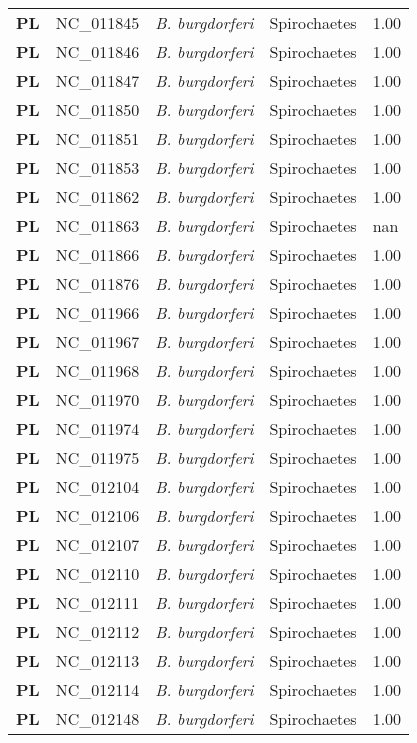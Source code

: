 \begin{adjustwidth}{-3cm}{2cm}
{\begin{supertabular}{>{\bfseries}l|p{0.1\textwidth}p{0.14\textwidth}l|l}
PL & NC\_011845 & \textit{B. burgdorferi} & Spirochaetes & 1.00\\
PL & NC\_011846 & \textit{B. burgdorferi} & Spirochaetes & 1.00\\
PL & NC\_011847 & \textit{B. burgdorferi} & Spirochaetes & 1.00\\
PL & NC\_011850 & \textit{B. burgdorferi} & Spirochaetes & 1.00\\
PL & NC\_011851 & \textit{B. burgdorferi} & Spirochaetes & 1.00\\
PL & NC\_011853 & \textit{B. burgdorferi} & Spirochaetes & 1.00\\
PL & NC\_011862 & \textit{B. burgdorferi} & Spirochaetes & 1.00\\
PL & NC\_011863 & \textit{B. burgdorferi} & Spirochaetes & nan\\
PL & NC\_011866 & \textit{B. burgdorferi} & Spirochaetes & 1.00\\
PL & NC\_011876 & \textit{B. burgdorferi} & Spirochaetes & 1.00\\
PL & NC\_011966 & \textit{B. burgdorferi} & Spirochaetes & 1.00\\
PL & NC\_011967 & \textit{B. burgdorferi} & Spirochaetes & 1.00\\
PL & NC\_011968 & \textit{B. burgdorferi} & Spirochaetes & 1.00\\
PL & NC\_011970 & \textit{B. burgdorferi} & Spirochaetes & 1.00\\
PL & NC\_011974 & \textit{B. burgdorferi} & Spirochaetes & 1.00\\
PL & NC\_011975 & \textit{B. burgdorferi} & Spirochaetes & 1.00\\
PL & NC\_012104 & \textit{B. burgdorferi} & Spirochaetes & 1.00\\
PL & NC\_012106 & \textit{B. burgdorferi} & Spirochaetes & 1.00\\
PL & NC\_012107 & \textit{B. burgdorferi} & Spirochaetes & 1.00\\
PL & NC\_012110 & \textit{B. burgdorferi} & Spirochaetes & 1.00\\
PL & NC\_012111 & \textit{B. burgdorferi} & Spirochaetes & 1.00\\
PL & NC\_012112 & \textit{B. burgdorferi} & Spirochaetes & 1.00\\
PL & NC\_012113 & \textit{B. burgdorferi} & Spirochaetes & 1.00\\
PL & NC\_012114 & \textit{B. burgdorferi} & Spirochaetes & 1.00\\
PL & NC\_012148 & \textit{B. burgdorferi} & Spirochaetes & 1.00\\

\end{supertabular}}
\end{adjustwidth}
